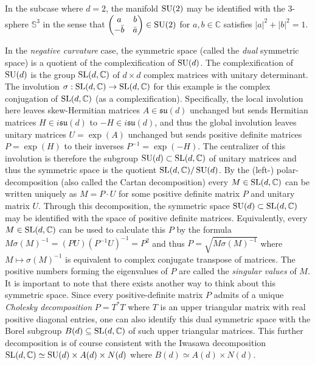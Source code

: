 \documentclass[notitlepage]{article}
\begin{document}
In the subcase where $d=2$, the manifold $\operatorname{SU}(2)$ may be identified with the $3$-sphere $\mathbb S^{3}$ in the sense that $\begin{pmatrix} a & b \\ -\bar b & \bar a \end{pmatrix} \in \operatorname{SU}(2)$ for $a,b\in \mathbb C$ satisfies $|a|^2 + |b|^2 = 1$.

In the \textit{negative curvature} case, the symmetric space (called the \textit{dual} symmetric space) is a quotient of the complexification of $\operatorname{SU}(d)$.
The complexification of $\operatorname{SU}(d)$ is the group $\operatorname{SL}(d, \mathbb C)$ of $d\times d$ complex matrices with unitary determinant.
The involution $\sigma : \operatorname{SL}(d, \mathbb C) \to \operatorname{SL}(d, \mathbb C)$ for this example is the complex conjugation of $\operatorname{SL}(d, \mathbb C)$ (as a complexification).
Specifically, the local involution here leaves skew-Hermitian matrices $A \in \mathfrak{su}(d)$ unchanged but sends Hermitian matrices $H \in i \mathfrak {su}(d)$ to $- H \in i \mathfrak {su}(d)$, and thus the global involution leaves unitary matrices $U = \exp(A)$ unchanged but sends positive definite matrices $P = \exp(H)$ to their inverses $P^{-1} = \exp(-H)$.
The centralizer of this involution is therefore the subgroup $\operatorname{SU}(d) \subset \operatorname{SL}(d, \mathbb C)$ of unitary matrices and thus the symmetric space is the quotient $\operatorname{SL}(d, \mathbb C)/\operatorname{SU}(d)$.
By the (left-) polar-decomposition (also called the Cartan decomposition) every $M \in \operatorname{SL}(d, \mathbb C)$ can be written uniquely as $M = P \cdot U$ for some positive definite matrix $P$ and unitary matrix $U$.
Through this decomposition, the symmetric space $\operatorname{SU}(d) \subset \operatorname{SL}(d, \mathbb C)$ may be identified with the space of positive definite matrices.
Equivalently, every $M \in \operatorname{SL}(d, \mathbb C)$ can be used to calculate this $P$ by the formula $M \sigma(M)^{-1} = (PU)(P^{-1}U)^{-1} = P^2$ and thus $P = \sqrt{M\sigma(M)^{-1}}$ where $M \mapsto \sigma(M)^{-1}$ is equivalent to complex conjugate transpose of matrices.
The positive numbers forming the eigenvalues of $P$ are called the \textit{singular values} of $M$.
It is important to note that there exists another way to think about this symmetric space.
Since every positive-definite matrix $P$ admits of a unique \textit{Cholesky decomposition} $P = T^{*}T$ where $T$ is an upper triangular matrix with real positive diagonal entries, one can also identify this dual symmetric space with the Borel subgroup $B(d) \subseteq \operatorname{SL}(d, \mathbb C)$ of such upper triangular matrices.
This further decomposition is of course consistent with the Iwasawa decomposition $\operatorname{SL}(d, \mathbb C) \simeq \operatorname{SU}(d) \times A(d) \times N(d)$ where $B(d) \simeq A(d) \times N(d)$.
\end{document}
